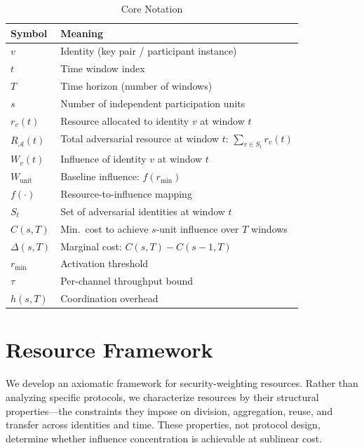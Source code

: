 \documentclass[10pt,journal,compsoc]{IEEEtran}
\theoremstyle{remark}
\begin{document}
	\begin{table}[t]
		\caption{Core Notation}
		\label{tab:notation}
		\centering
		\renewcommand{\arraystretch}{1.25}
		\begin{tabular}{@{}ll@{}}
			\toprule
			\textbf{Symbol} & \textbf{Meaning} \\
			\midrule
			$v$                  & Identity (key pair / participant instance) \\
			$t$                  & Time window index \\
			$T$                  & Time horizon (number of windows) \\
			$s$                  & Number of independent participation units \\
			$r_v(t)$             & Resource allocated to identity $v$ at window $t$ \\
			$R_{\mathcal{A}}(t)$ & Total adversarial resource at window $t$: $\sum_{v \in S_t} r_v(t)$ \\
			$W_v(t)$             & Influence of identity $v$ at window $t$ \\
			$W_{\mathrm{unit}}$  & Baseline influence: $f(r_{\min})$ \\
			$f(\cdot)$           & Resource-to-influence mapping \\
			$S_t$                & Set of adversarial identities at window $t$ \\
			$C(s,T)$             & Min.\ cost to achieve $s$-unit influence over $T$ windows \\
			$\Delta(s,T)$        & Marginal cost: $C(s,T) - C(s-1,T)$ \\
			$r_{\min}$           & Activation threshold \\
			$\tau$               & Per-channel throughput bound \\
			$h(s,T)$             & Coordination overhead \\
			\bottomrule
		\end{tabular}
	\end{table}
	
	\section{Resource Framework}
	\label{sec:framework}
	
	We develop an axiomatic framework for security-weighting
	resources.
	Rather than analyzing specific protocols, we characterize
	resources by their structural properties---the constraints
	they impose on division, aggregation, reuse, and transfer
	across identities and time.
	These properties, not protocol design, determine whether
	influence concentration is achievable at sublinear cost.
	
\end{document}
